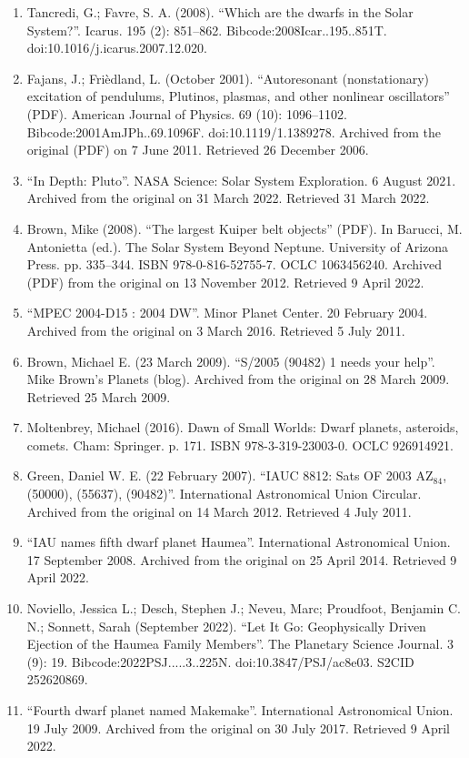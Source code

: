 \begin{enumerate}
\item Tancredi, G.; Favre, S. A. (2008). ``Which are the dwarfs in the Solar System?''. Icarus. 195 (2): 851–862. Bibcode:2008Icar..195..851T. doi:10.1016/j.icarus.2007.12.020.
\item Fajans, J.; Frièdland, L. (October 2001). ``Autoresonant (nonstationary) excitation of pendulums, Plutinos, plasmas, and other nonlinear oscillators'' (PDF). American Journal of Physics. 69 (10): 1096–1102. Bibcode:2001AmJPh..69.1096F. doi:10.1119/1.1389278. Archived from the original (PDF) on 7 June 2011. Retrieved 26 December 2006.
\item ``In Depth: Pluto''. NASA Science: Solar System Exploration. 6 August 2021. Archived from the original on 31 March 2022. Retrieved 31 March 2022.
\item Brown, Mike (2008). ``The largest Kuiper belt objects'' (PDF). In Barucci, M. Antonietta (ed.). The Solar System Beyond Neptune. University of Arizona Press. pp. 335–344. ISBN 978-0-816-52755-7. OCLC 1063456240. Archived (PDF) from the original on 13 November 2012. Retrieved 9 April 2022.
\item ``MPEC 2004-D15 : 2004 DW''. Minor Planet Center. 20 February 2004. Archived from the original on 3 March 2016. Retrieved 5 July 2011.
\item Brown, Michael E. (23 March 2009). ``S/2005 (90482) 1 needs your help''. Mike Brown's Planets (blog). Archived from the original on 28 March 2009. Retrieved 25 March 2009.
\item Moltenbrey, Michael (2016). Dawn of Small Worlds: Dwarf planets, asteroids, comets. Cham: Springer. p. 171. ISBN 978-3-319-23003-0. OCLC 926914921.
\item Green, Daniel W. E. (22 February 2007). ``IAUC 8812: Sats OF 2003 AZ$_{84}$, (50000), (55637), (90482)''. International Astronomical Union Circular. Archived from the original on 14 March 2012. Retrieved 4 July 2011.
\item ``IAU names fifth dwarf planet Haumea''. International Astronomical Union. 17 September 2008. Archived from the original on 25 April 2014. Retrieved 9 April 2022.
\item Noviello, Jessica L.; Desch, Stephen J.; Neveu, Marc; Proudfoot, Benjamin C. N.; Sonnett, Sarah (September 2022). ``Let It Go: Geophysically Driven Ejection of the Haumea Family Members''. The Planetary Science Journal. 3 (9): 19. Bibcode:2022PSJ.....3..225N. doi:10.3847/PSJ/ac8e03. S2CID 252620869.
\item ``Fourth dwarf planet named Makemake''. International Astronomical Union. 19 July 2009. Archived from the original on 30 July 2017. Retrieved 9 April 2022.

\end{enumerate}
